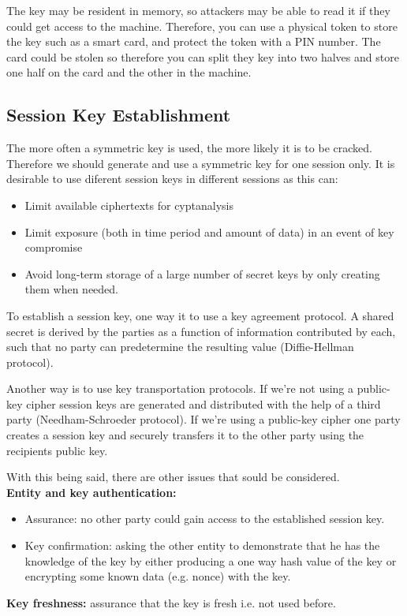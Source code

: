 \documentclass{article}
\begin{document}
The key may be resident in memory, so attackers may be able to read it if they could get access to the machine. Therefore, you can use a physical token to store the key such as a smart card, and protect the token with a PIN number. The card could be stolen so therefore you can split they key into two halves and store one half on the card and the other in the machine.

\subsection{Session Key Establishment}
The more often a symmetric key is used, the more likely it is to be cracked. Therefore we should generate and use a symmetric key for one session only. It is desirable to use diferent session keys in different sessions as this can:
\begin{itemize}
  \item Limit available ciphertexts for cyptanalysis
  \item Limit exposure (both in time period and amount of data) in an event of key compromise
  \item Avoid long-term storage of a large number of secret keys by only creating them when needed.
\end{itemize}
To establish a session key, one way it to use a key agreement protocol. A shared secret is derived by the parties as a function of information contributed by each, such that no party can predetermine the resulting value (Diffie-Hellman protocol).

Another way is to use key transportation protocols. If we're not using a public-key cipher session keys are generated and distributed with the help of a third party (Needham-Schroeder protocol). If we're using a public-key cipher one party creates a session key and securely transfers it to the other party using the recipients public key.

With this being said, there are other issues that sould be considered. \\
\textbf{Entity and key authentication:}
\begin{itemize}
  \item Assurance: no other party could gain access to the established session key.
  \item Key confirmation: asking the other entity to demonstrate that he has the knowledge of the key by either producing a one way hash value of the key or encrypting some known data (e.g. nonce) with the key.
\end{itemize}
\textbf{Key freshness:} assurance that the key is fresh i.e. not used before.
\end{document}
